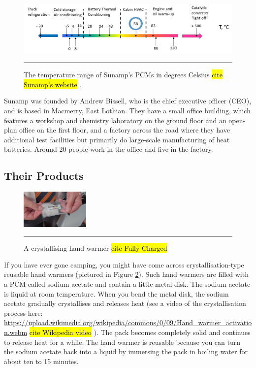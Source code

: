 \begin{figure}[htbp]
	\centering
	\includegraphics[width=\textwidth]{figures/temperature-range-of-PCMs.jpg}
	\rule{\textwidth}{0.5pt} %
	\caption{The temperature range of Sunamp's PCMs in degrees Celsius \hl{cite Sunamp's website}
		.}
	\label{pcm_temp_range}
\end{figure}


Sunamp was founded by Andrew Bissell, who is the chief executive officer (CEO), and is based in Macmerry, East Lothian.
They have a small office building, which features a workshop and chemistry laboratory on the ground floor and an open-plan office on the first floor, and a factory across the road where they have additional test facilities but primarily do large-scale manufacturing %
of heat batteries.
Around 20 people work in the office and five in the factory.


\subsection*{Their Products}

\begin{figure}
	\includegraphics[width=0.3\textwidth]{figures/sunamp-hand-warmer.png}
	\rule{0.3\textwidth}{0.5pt} %
	\caption{A crystallising hand warmer \hl{cite Fully Charged} 
	}
	\label{fig:handwarmer}
\end{figure}

If you have ever gone camping, you might have come across crystallisation-type reusable hand warmers (pictured in Figure \ref{fig:handwarmer}).
Such hand warmers are filled with a PCM called sodium acetate and contain a little metal disk.
The sodium acetate is liquid at room temperature.
When you bend the metal disk, the sodium acetate gradually crystallises and releases heat 
(see a video of the crystallisation process here: 
\url{https://upload.wikimedia.org/wikipedia/commons/0/09/Hand_warmer_activation.webm} \hl{cite Wikipedia video}
).
The pack becomes completely solid and continues to release heat for a while.
The hand warmer is reusable because you can turn the sodium acetate back into a liquid by immersing the pack in boiling water for about ten to 15 minutes.

